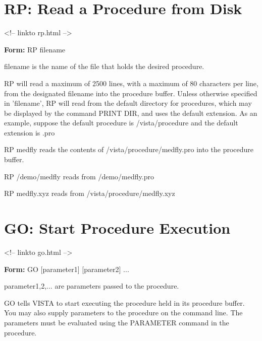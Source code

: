 \section{RP: Read a Procedure from Disk}
\begin{rawhtml}
<!-- linkto rp.html -->
\end{rawhtml}

\begin{command}
  \item[\textbf{Form: } RP filename\hfill]{}
  \item[filename]{is the name of the file that holds the desired procedure.}
\end{command}

RP will read a maximum of 2500 lines, with a maximum of 80 characters per
line, from the designated filename into the procedure buffer.  Unless
otherwise specified in 'filename', RP will read from the default directory
for procedures, which may be displayed by the command PRINT DIR, and uses
the default extension.  As an example, suppose the default procedure is
/vista/procedure and the default extension is .pro

\begin{example}
  \item[RP medfly\hfill]{reads the contents of /vista/procedure/medfly.pro
       into the procedure buffer.}
  \item[RP /demo/medfly\hfill]{reads from /demo/medfly.pro}
  \item[RP medfly.xyz\hfill]{reads from /vista/procedure/medfly.xyz}
\end{example}

\section{GO: Start Procedure Execution}
\begin{rawhtml}
<!-- linkto go.html -->
\end{rawhtml}

\begin{command}
  \item[\textbf{Form: } GO {[parameter1]} {[parameter2]} ...]{}
  \item[parameter1,2,...]{are parameters passed to the procedure.}
\end{command}
GO tells VISTA to start executing the procedure held in its procedure
buffer.  You may also supply parameters to the procedure on the command
line.  The parameters must be evaluated using the PARAMETER command in the
procedure.

